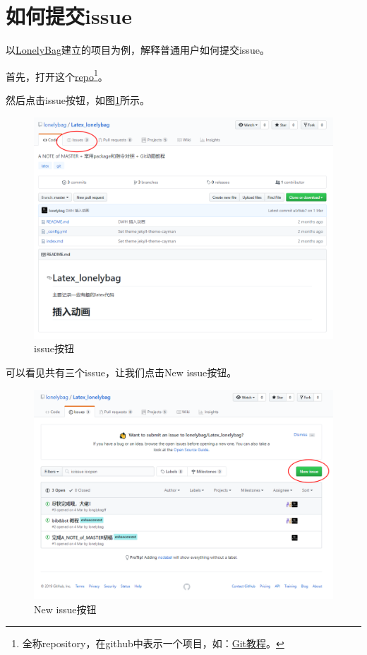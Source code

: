 \documentclass[UTF8,oneside]{ctexbook}
\begin{document}
\section{如何提交issue}
以\href{https://github.com/lonelybag?tab=repositories}{\Large{LonelyBag}}建立的项目为例，解释普通用户如何提交issue。

首先，打开这个\href{https://github.com/lonelybag/Latex_lonelybag}{repo}\footnote{全称repository，在github中表示一个项目，如：\href{https://github.com/lonelybag/git-flight-rules/blob/master/README_zh-CN.md}{Git教程}。}。

然后点击issue按钮，如图\ref{fig:issue1}所示。
\begin{figure}[H]
	\centering
	\includegraphics[width=0.6\linewidth]{Pics/issue1.png}
	\vspace{-0.3cm}
	\caption{issue按钮}\label{fig:issue1}
\end{figure}

可以看见共有三个issue，让我们点击New issue按钮。
\begin{figure}[H]
	\centering
	\includegraphics[width=0.6\linewidth]{Pics/issue2.png}
	\vspace{-0.3cm}
	\caption{New issue按钮}\label{fig:issue2}
\end{figure}
\end{document}
